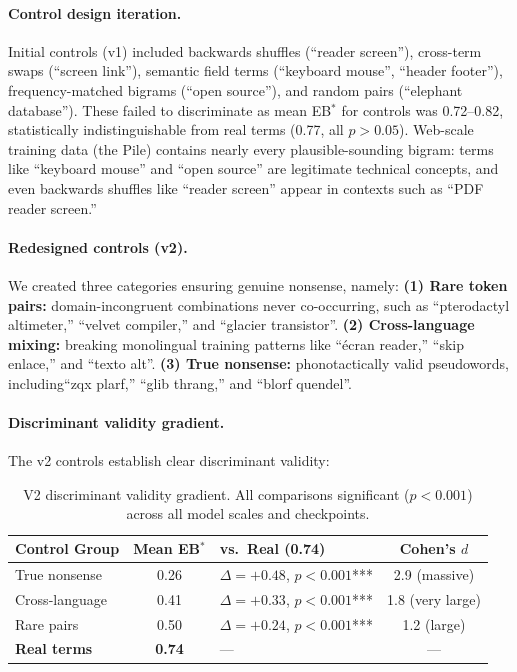 \documentclass[10pt]{article} %
\begin{document}
\paragraph{Control design iteration.}
Initial controls (v1) included backwards shuffles (``reader screen''), cross-term swaps (``screen link''), semantic field terms (``keyboard mouse'', ``header footer''), frequency-matched bigrams (``open source''), and random pairs (``elephant database'').
These failed to discriminate as mean EB$^*$ for controls was 0.72--0.82, statistically indistinguishable from real terms (0.77, all $p>0.05$).
Web-scale training data (the Pile) contains nearly every plausible-sounding bigram: terms like ``keyboard mouse'' and ``open source'' are legitimate technical concepts, and even backwards shuffles like ``reader screen'' appear in contexts such as ``PDF reader screen.''

\paragraph{Redesigned controls (v2).}
We created three categories ensuring genuine nonsense, namely:
\textbf{(1) Rare token pairs:} domain-incongruent combinations never co-occurring, such as ``pterodactyl altimeter,'' ``velvet compiler,'' and ``glacier transistor''.
\textbf{(2) Cross-language mixing:} breaking monolingual training patterns like ``\'ecran reader,'' ``skip enlace,'' and ``texto alt''.
\textbf{(3) True nonsense:} phonotactically valid pseudowords, including``zqx plarf,'' ``glib thrang,'' and ``blorf quendel''.

\paragraph{Discriminant validity gradient.}
The v2 controls establish clear discriminant validity:

\begin{table}[h]
\centering
\small
\begin{tabular}{|l|c|l|c|}
\hline
\textbf{Control Group} & \textbf{Mean EB$^*$} & \textbf{vs.\ Real (0.74)} & \textbf{Cohen's $d$} \\
\hline
True nonsense & 0.26 & $\Delta=+0.48$, $p<0.001$*** & 2.9 (massive) \\
Cross-language & 0.41 & $\Delta=+0.33$, $p<0.001$*** & 1.8 (very large) \\
Rare pairs & 0.50 & $\Delta=+0.24$, $p<0.001$*** & 1.2 (large) \\
\textbf{Real terms} & \textbf{0.74} & --- & --- \\
\hline
\end{tabular}
\caption{V2 discriminant validity gradient. All comparisons significant ($p<0.001$) across all model scales and checkpoints.}
\label{tab:v2_gradient}
\end{table}
\end{document}
